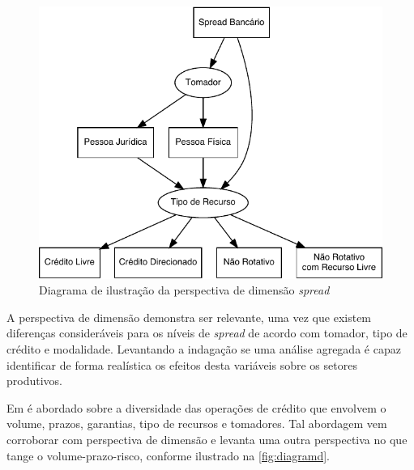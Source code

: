\documentclass[
  12pt,
  12pt,
  openright,
  oneside,
  a4paper,
  chapter=TITLE,
  section=TITLE,
  subsection=TITLE,
  subsubsection=TITLE,
  english,
  portugues,
  sumario=tradicional]{abntex2}
\begin{document}
\begin{figure}[!htbp]
\vspace{20pt}
\caption{Diagrama de ilustração da perspectiva de dimensão  \emph{spread}}
\vspace{-4mm}

\begin{center}\includegraphics{12-exportedfigures/diagram.spread.dim-1} \end{center}
\vspace{-3mm}
\label{fig:diagramc}
\vspace{-2mm}
\end{figure}

A perspectiva de dimensão demonstra ser relevante, uma vez que existem diferenças consideráveis para os níveis de \emph{spread} de acordo com tomador, tipo de crédito e modalidade. Levantando a indagação se uma análise agregada é capaz identificar de forma realística os efeitos desta variáveis sobre os setores produtivos.

Em \textcite{BCB:1999} é abordado sobre a diversidade das operações de crédito que envolvem o volume, prazos, garantias, tipo de recursos e tomadores. Tal abordagem vem corroborar com perspectiva de dimensão e levanta uma outra perspectiva no que tange o volume-prazo-risco, conforme ilustrado na \autoref{fig:diagramd}.
\end{document}
